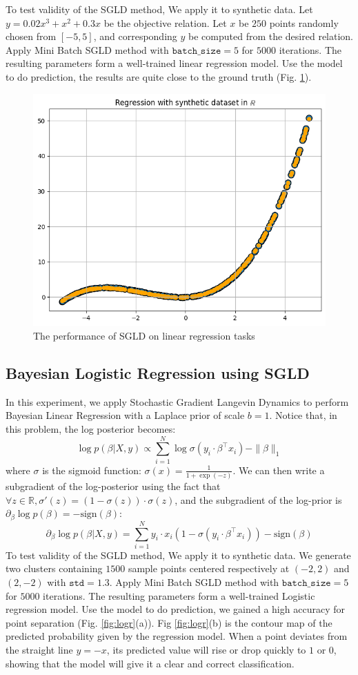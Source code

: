 \documentclass[10pt]{amsart}
\begin{document}
To test validity of the SGLD method, We apply it to synthetic data. Let $y=0.02x^3+x^2+0.3x$ be the objective relation. Let $x$ be $250$ points randomly chosen from $[-5,5]$, and corresponding $y$ be computed from the desired relation. Apply Mini Batch SGLD method with $\texttt{batch\_size}=5$ for $5000$ iterations. The resulting parameters form a well-trained linear regression model. Use the model to do prediction, the results are quite close to the ground truth (Fig. \ref{fig:lr}).
\begin{figure}[h]
    \centering
    \includegraphics[width=0.5\linewidth]{graph/SGLD_LR.npg.png}
    \caption{The performance of SGLD on linear regression tasks}
    \label{fig:lr}
\end{figure}

\subsection{Bayesian Logistic Regression using SGLD}
In this experiment, we apply Stochastic Gradient Langevin Dynamics to perform Bayesian Linear Regression with a Laplace prior of scale \( b=1 \). Notice that, in this problem, the log posterior becomes:
$$
\log p(\beta | X, y) \propto \sum_{i=1}^N \log \sigma(y_i \cdot \beta^{\top}x_i) - \|\beta\|_1
$$
where $\sigma$ is the sigmoid function: $\sigma(x)=\frac{1}{1+\exp(-z)}$. We can then write a subgradient of the log-posterior using the fact that $\forall z \in \mathbb{R}, \sigma'(z) = (1 - \sigma(z)) \cdot \sigma(z)$, and the subgradient of the log-prior is $\partial_{\beta} \log p(\beta) = - \text{sign}(\beta)$:
$$
\partial_{\beta} \log p(\beta | X, y) = \sum_{i=1}^N y_i \cdot x_i \left( 1 - \sigma(y_i \cdot \beta^{\top}x_i) \right) - \text{sign}(\beta)
$$
To test validity of the SGLD method, We apply it to synthetic data. We generate two clusters containing $1500$ sample points centered respectively at $(-2,2)$ and $(2,-2)$ with $\texttt{std}=1.3$. Apply Mini Batch SGLD method with $\texttt{batch\_size}=5$ for $5000$ iterations. The resulting parameters form a well-trained Logistic regression model. Use the model to do prediction, we gained a high accuracy for point separation (Fig. \ref{fig:logr}(a)). Fig \ref{fig:logr}(b) is the contour map of the predicted probability given by the regression model. When a point deviates from the straight line $y=-x$, its predicted value will rise or drop quickly to $1$ or $0$, showing that the model will give it a clear and correct classification.



\end{document}
